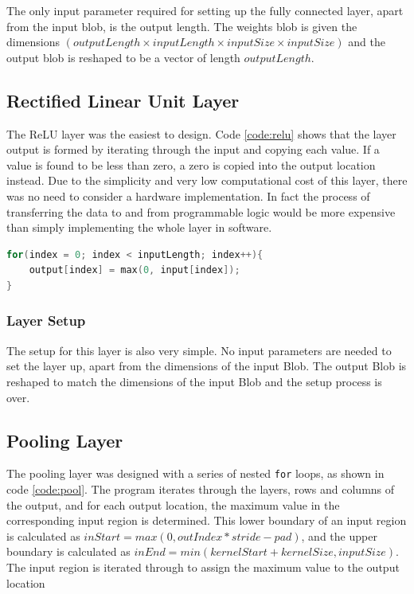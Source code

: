 \documentclass[12pt]{article}
\begin{document}
The only input parameter required for setting up the fully connected layer, apart from the input blob, is the output length. The weights blob is given the dimensions $(outputLength \times inputLength \times inputSize \times inputSize)$ and the output blob is reshaped to be a vector of length $outputLength$. 

\subsection{Rectified Linear Unit Layer}
\label{sec:Design-Relu}

The ReLU layer was the easiest to design. Code \ref{code:relu} shows that the layer output is formed by iterating through the input and copying each value. If a value is found to be less than zero, a zero is copied into the output location instead. Due to the simplicity and very low computational cost of this layer, there was no need to consider a hardware implementation. In fact the process of transferring the data to and from programmable logic would be more expensive than simply implementing the whole layer in software. 

\renewcommand{\lstlistingname}{Code}
\begin{lstlisting}[caption=ReLU layer computation, label=code:relu, language=C, float=ht]
for(index = 0; index < inputLength; index++){
	output[index] = max(0, input[index]);
}
\end{lstlisting} 

\subsubsection{Layer Setup}
\label{sec:Design-Relu-Setup}

The setup for this layer is also very simple. No input parameters are needed to set the layer up, apart from the dimensions of the input Blob. The output Blob is reshaped to match the dimensions of the input Blob and the setup process is over.

\subsection{Pooling Layer}
\label{sec:Design-Pool}

The pooling layer was designed with a series of nested \lstinline|for| loops, as shown in code \ref{code:pool}. The program iterates through the layers, rows and columns of the output, and for each output location, the maximum value in the corresponding input region is determined. This lower boundary of an input region is calculated as $inStart = max(0, outIndex * stride - pad)$, and the upper boundary is calculated as $inEnd = min(kernelStart + kernelSize, inputSize)$. The input region is iterated through to assign the maximum value to the output location
\end{document}
